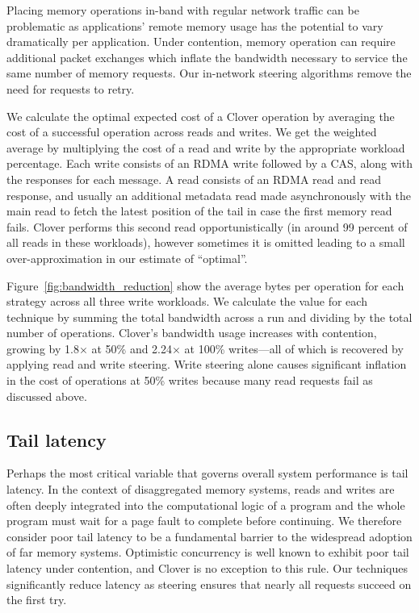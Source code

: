 Placing memory operations in-band with regular network traffic can be
problematic as applications' remote memory usage has the potential to
vary dramatically per application.  Under contention, memory operation
can require additional packet exchanges which inflate the bandwidth
necessary to service the same number of memory requests. Our
in-network steering algorithms remove the need for requests to
retry.


We calculate the optimal expected cost of a Clover operation by
averaging the cost of a successful operation across reads and
writes. We get the weighted average by multiplying the cost of a read
and write by the appropriate workload percentage. Each write consists
of an RDMA write followed by a CAS, along with the responses for each
message. A read consists of an RDMA read and read response, and
usually an additional metadata read made asynchronously with the main
read to fetch the latest position of the tail in case the first memory
read fails. Clover performs this second read opportunistically (in
around 99 percent of all reads in these workloads), however sometimes
it is omitted leading to a small over-approximation in our estimate of
``optimal''.

Figure~\ref{fig:bandwidth_reduction} show the average bytes per
operation for each strategy across all three write workloads. We
calculate the value for each technique by summing the total bandwidth
across a run and dividing by the total number of operations. Clover's
bandwidth usage increases with contention, growing by 1.8$\times$ at
50\% and 2.24$\times$ at 100\% writes---all of which is recovered by
applying read and write steering. Write steering alone causes
significant inflation in the cost of operations at 50\% writes because many
read requests fail as discussed above.

\subsection{Tail latency}

Perhaps the most critical variable that governs overall system
performance is tail latency. In the context of disaggregated memory
systems, reads and writes are often deeply integrated into the
computational logic of a program and the whole program must wait for a
page fault to complete before continuing. We therefore consider poor
tail latency to be a fundamental barrier to the widespread adoption of
far memory systems.  Optimistic concurrency is well known to exhibit
poor tail latency under contention, and Clover is no exception to this
rule. Our techniques significantly reduce latency as steering
ensures that nearly all requests succeed on the first try.

